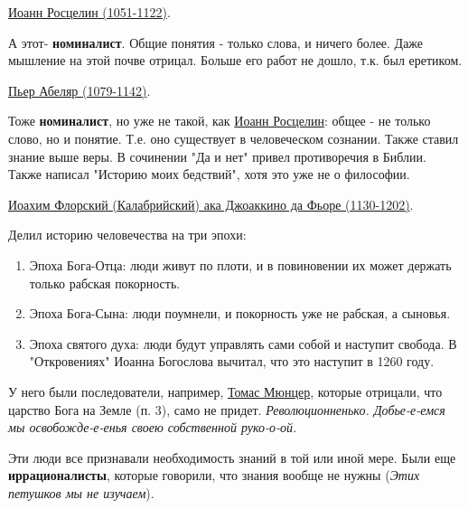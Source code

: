 \underline{Иоанн Росцелин (1051-1122)}. 

А этот- \textbf{номиналист}. Общие понятия - только слова, и ничего более. Даже мышление на этой почве отрицал.
Больше его работ не дошло, т.к. был еретиком.

\underline{Пьер Абеляр (1079-1142)}. 

Тоже \textbf{номиналист}, но уже не такой, как \underline{Иоанн Росцелин}: общее - не только слово, но и понятие. Т.е. оно существует в человеческом сознании. Также ставил знание выше веры. В сочинении "Да и нет" привел противоречия в Библии. Также написал "Историю моих бедствий", хотя это уже не о философии.

\underline{Иоахим Флорский (Калабрийский) ака Джоаккино да Фьоре  (1130-1202)}. 

Делил историю человечества на три эпохи:
\begin{enumerate}
\item Эпоха Бога-Отца: люди живут по плоти, и в повиновении их может держать только рабская покорность.
\item Эпоха Бога-Сына: люди поумнели, и покорность уже не рабская, а сыновья.
\item Эпоха святого духа: люди будут управлять сами собой и наступит свобода. В "Откровениях" Иоанна Богослова вычитал, что это наступит в 1260 году. 
\end{enumerate}
У него были последователи, например, \underline{Томас Мюнцер}, которые отрицали, что царство Бога на Земле (п. 3), само не придет. \textit{Революционненько. Добье-е-емся мы освобожде-е-енья своею собственной руко-о-ой.}
 
Эти люди все признавали необходимость знаний в той или иной мере. Были еще \textbf{иррационалисты}, которые говорили, что знания вообще не нужны (\textit{Этих петушков мы не изучаем}).

